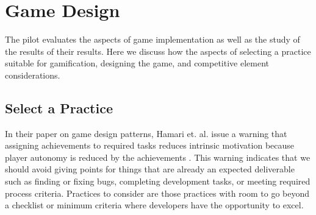 \documentclass{sig-alternate}
\begin{document}
\section{Game Design}


The pilot evaluates the aspects of game implementation as well as the study of the results of their results. Here we discuss how the aspects of selecting a practice suitable for gamification, designing the game, and competitive element considerations.

\subsection{Select a Practice}
In their paper on game design patterns, Hamari et. al. issue a warning that assigning achievements to required tasks reduces intrinsic motivation because player autonomy is reduced by the achievements \cite{wbsnipes:Hamari2011Framework} .  This warning indicates that we should avoid giving points for things that are already an expected deliverable such as finding or fixing bugs, completing development tasks, or meeting required process criteria.  Practices to consider are those practices with room to go beyond a checklist or minimum criteria where developers have the opportunity to excel.
\end{document}
